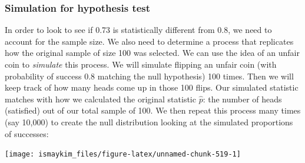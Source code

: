 \documentclass[12pt, krantz2,]{krantz}
\makeatletter
\newenvironment{Shaded}{\begin{snugshade}}{\end{snugshade}}
\newcommand{\DataTypeTok}[1]{\textcolor[rgb]{0.27,0.27,0.27}{#1}}
\newcommand{\DecValTok}[1]{\textcolor[rgb]{0.06,0.06,0.06}{#1}}
\newcommand{\FloatTok}[1]{\textcolor[rgb]{0.06,0.06,0.06}{#1}}
\newcommand{\KeywordTok}[1]{\textcolor[rgb]{0.27,0.27,0.27}{\textbf{#1}}}
\newcommand{\NormalTok}[1]{#1}
\newcommand{\OperatorTok}[1]{\textcolor[rgb]{0.43,0.43,0.43}{\textbf{#1}}}
\newcommand{\StringTok}[1]{\textcolor[rgb]{0.5,0.5,0.5}{#1}}
\newenvironment{kframe}{%
\medskip{}
\setlength{\fboxsep}{.8em}
 \def\at@end@of@kframe{}%
 \ifinner\ifhmode%
  \def\at@end@of@kframe{\end{minipage}}%
  \begin{minipage}{\columnwidth}%
 \fi\fi%
 \def\FrameCommand##1{\hskip\@totalleftmargin \hskip-\fboxsep
 \colorbox{shadecolor}{##1}\hskip-\fboxsep
     \hskip-\linewidth \hskip-\@totalleftmargin \hskip\columnwidth}%
 \MakeFramed {\advance\hsize-\width
   \@totalleftmargin\z@ \linewidth\hsize
   \@setminipage}}%
 {\par\unskip\endMakeFramed%
 \at@end@of@kframe}
\renewenvironment{Shaded}{\begin{kframe}}{\end{kframe}}
\makeatother
\begin{document}
\hypertarget{simulation-for-hypothesis-test}{%
\subsubsection*{Simulation for hypothesis test}\label{simulation-for-hypothesis-test}}


In order to look to see if 0.73 is statistically different from 0.8, we need to account for the sample size. We also need to determine a process that replicates how the original sample of size 100 was selected. We can use the idea of an unfair coin to \emph{simulate} this process. We will simulate flipping an unfair coin (with probability of success 0.8 matching the null hypothesis) 100 times. Then we will keep track of how many heads come up in those 100 flips. Our simulated statistic matches with how we calculated the original statistic \(\hat{p}\): the number of heads (satisfied) out of our total sample of 100. We then repeat this process many times (say 10,000) to create the null distribution looking at the simulated proportions of successes:

\begin{Shaded}
\end{Shaded}

\begin{Shaded}
\end{Shaded}

\begin{center}\texttt{[image: ismaykim\_files/figure-latex/unnamed-chunk-519-1]} \end{center}
\end{document}
